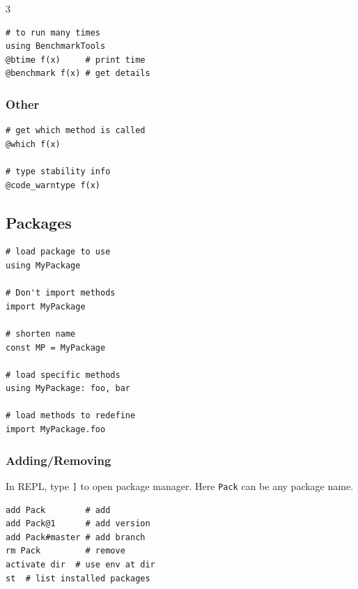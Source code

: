 \begin{multicols*}{3}
\begin{verbatim}
# to run many times
using BenchmarkTools
@btime f(x)     # print time
@benchmark f(x) # get details
\end{verbatim}

\subsubsection{Other}
\vspace*{-2mm}
\begin{verbatim}
# get which method is called
@which f(x)

# type stability info
@code_warntype f(x)
\end{verbatim}

\subsection{Packages}
\vspace*{-2mm}
\begin{verbatim}
# load package to use
using MyPackage 

# Don't import methods
import MyPackage

# shorten name
const MP = MyPackage

# load specific methods
using MyPackage: foo, bar 

# load methods to redefine 
import MyPackage.foo
\end{verbatim}

\subsubsection{Adding/Removing}
In REPL, type \texttt{]} to open 
package manager. Here \texttt{Pack}
can be any package name.
\begin{verbatim}
add Pack        # add
add Pack@1      # add version
add Pack#master # add branch
rm Pack         # remove
activate dir  # use env at dir
st  # list installed packages
\end{verbatim}



\end{multicols*}
